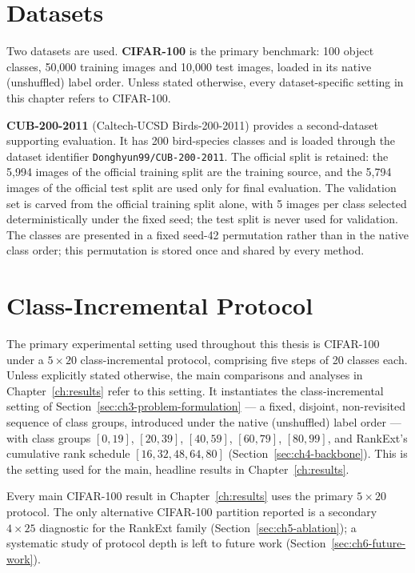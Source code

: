 \section{Datasets}
\label{sec:ch4-datasets}

Two datasets are used. \textbf{CIFAR-100} \parencite{krizhevsky2009learning}
is the primary benchmark: 100 object classes, 50,000 training
images and 10,000 test images, loaded in its native (unshuffled) label
order. Unless stated otherwise, every dataset-specific setting in this
chapter refers to CIFAR-100.

\textbf{CUB-200-2011} (Caltech-UCSD Birds-200-2011) \parencite{wah2011cub} provides a second-dataset
supporting evaluation. It has 200 bird-species classes and is loaded through
the dataset identifier \texttt{Donghyun99/\allowbreak CUB-200-2011}. The official split
is retained: the 5,994 images of the official training split are the
training source, and the 5,794 images of the official test split are used
only for final evaluation. The validation set is carved from the official
training split alone, with 5 images per class selected deterministically
under the fixed seed; the test split is never used for validation. The
classes are presented in a fixed seed-42 permutation rather than in the
native class order; this permutation is stored once and shared by every
method.

\section{Class-Incremental Protocol}
\label{sec:ch4-protocols}

The primary experimental setting used throughout this thesis is CIFAR-100
under a $5\times20$ class-incremental protocol, comprising five steps of 20
classes each. Unless explicitly stated otherwise, the main comparisons and
analyses in Chapter~\ref{ch:results} refer to this setting. It instantiates
the class-incremental setting of
Section~\ref{sec:ch3-problem-formulation} --- a fixed, disjoint,
non-revisited sequence of class groups, introduced under the native
(unshuffled) label order --- with class groups $[0,19]$, $[20,39]$,
$[40,59]$, $[60,79]$, $[80,99]$, and RankExt's cumulative rank schedule
$[16,32,48,64,80]$ (Section~\ref{sec:ch4-backbone}). This is the setting
used for the main, headline results in Chapter~\ref{ch:results}.

Every main CIFAR-100 result in Chapter~\ref{ch:results} uses the primary
$5\times20$ protocol. The only alternative CIFAR-100 partition reported is
a secondary $4\times25$ diagnostic for the RankExt family
(Section~\ref{sec:ch5-ablation}); a systematic study of protocol depth is
left to future work (Section~\ref{sec:ch6-future-work}).

